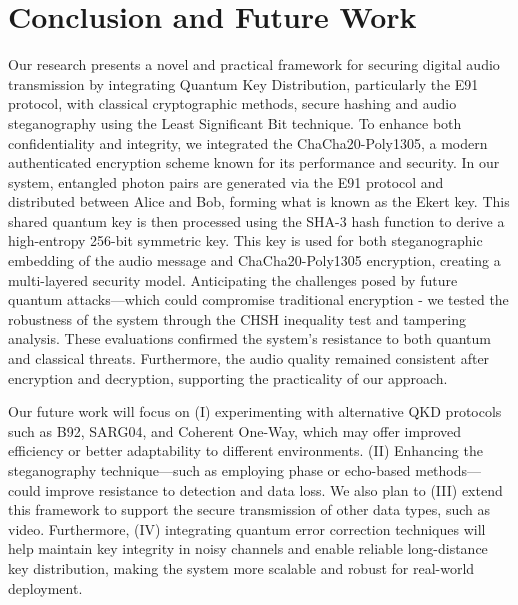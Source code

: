 \documentclass[a4paper]{cas-sc}
\begin{document}
\section{Conclusion and Future Work}
\label{sec:conclusion}
Our research presents a novel and practical framework for securing digital audio transmission by integrating Quantum Key Distribution, particularly the E91 protocol, with classical cryptographic methods, secure hashing and audio steganography using the Least Significant Bit technique. To enhance both confidentiality and integrity, we integrated the ChaCha20-Poly1305, a modern authenticated encryption scheme known for its performance and security. In our system, entangled photon pairs are generated via the E91 protocol and distributed between Alice and Bob, forming what is known as the Ekert key. This shared quantum key is then processed using the SHA-3 hash function to derive a high-entropy 256-bit symmetric key. This key is used for both steganographic embedding of the audio message and ChaCha20-Poly1305 encryption, creating a multi-layered security model. Anticipating the challenges posed by future quantum attacks—which could compromise traditional encryption - we tested the robustness of the system through the CHSH inequality test and tampering analysis. These evaluations confirmed the system's resistance to both quantum and classical threats. Furthermore, the audio quality remained consistent after encryption and decryption, supporting the practicality of our approach.

Our future work will focus on (I) experimenting with alternative QKD protocols such as B92, SARG04, and Coherent One-Way, which may offer improved efficiency or better adaptability to different environments.\cite{nurhadi2018quantum} (II) Enhancing the steganography technique—such as employing phase or echo-based methods—could improve resistance to detection and data loss. We also plan to (III) extend this framework to support the secure transmission of other data types, such as video. Furthermore, (IV) integrating quantum error correction techniques\cite{devitt2013quantum} will help maintain key integrity in noisy channels and enable reliable long-distance key distribution\cite{nagata2017quantum}, making the system more scalable and robust for real-world deployment.

\end{document}
